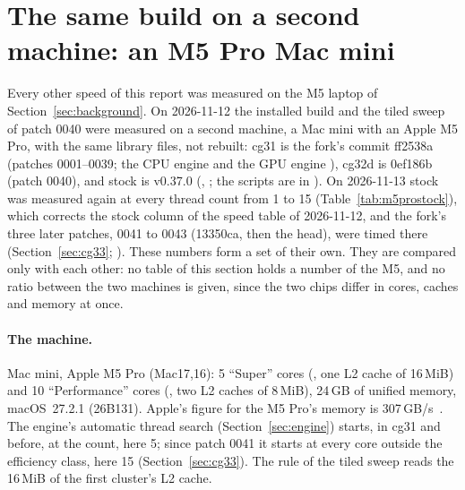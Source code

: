 \section{The same build on a second machine: an M5 Pro Mac mini}\label{sec:m5pro}

Every other speed of this report was measured on the M5 laptop of Section~\ref{sec:background}. On 2026-11-12 the
installed build and the tiled sweep of patch 0040 were measured on a second machine, a Mac mini with an Apple M5 Pro,
with the same library files, not rebuilt: cg31 is the fork's commit ff2538a (patches 0001--0039; the CPU engine
 and the GPU engine ), cg32d is 0ef186b (patch 0040), and stock is v0.37.0
(, ; the scripts are
in ). On 2026-11-13 stock was measured again at every thread count from 1 to 15
(Table~\ref{tab:m5prostock}), which corrects the stock column of the speed table of 2026-11-12, and the fork's three
later patches, 0041 to 0043 (13350ca, then the head), were timed there (Section~\ref{sec:cg33}; ).
These numbers form a set of their own. They are compared only with each other: no table of
this section holds a number of the M5, and no ratio between the two machines is given, since the two chips differ in
cores, caches and memory at once.

\paragraph{The machine.} Mac mini, Apple M5 Pro (Mac17,16): 5 ``Super'' cores (, one L2 cache of
16\,MiB) and 10 ``Performance'' cores (, two L2 caches of 8\,MiB), 24\,GB of unified memory,
macOS~27.2.1 (26B131). Apple's figure for the M5 Pro's memory is 307\,GB/s~\cite{macmini}. The engine's automatic
thread search (Section~\ref{sec:engine}) starts, in cg31 and before, at the  count, here 5; since
patch 0041 it starts at every core outside the efficiency class, here 15 (Section~\ref{sec:cg33}). The 
rule of the tiled sweep reads the 16\,MiB of the first cluster's L2 cache.

